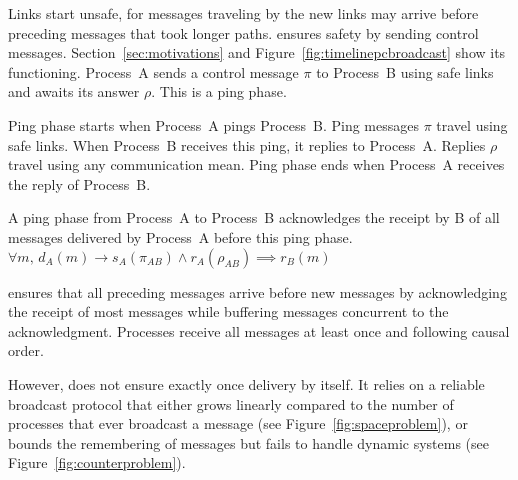 Links start unsafe, for messages traveling by the new links may arrive before
preceding messages that took longer paths. \PCBROADCAST ensures safety by
sending control messages. Section~\ref{sec:motivations} and
Figure~\ref{fig:timelinepcbroadcast} show its functioning. Process~A sends a
control message $\pi$ to Process~B using safe links and awaits its answer
$\rho$. This is a ping phase.

\begin{definition}
  Ping phase starts when Process~A pings Process~B. Ping messages $\pi$ travel
  using safe links. When Process~B receives this ping, it replies to
  Process~A. Replies $\rho$ travel using any communication mean. Ping phase ends
  when Process~A receives the reply of Process~B.
\end{definition}

\begin{lemma}
  A ping phase from Process~A to Process~B acknowledges the receipt by B of all
  messages delivered by Process~A before this ping phase.
  $\forall m,\, d_A(m) \rightarrow s_A(\pi_{AB}) \wedge r_A(\rho_{AB}) \implies
  r_B(m)$
\end{lemma}

\PCBROADCAST ensures that all preceding messages arrive before new messages by
acknowledging the receipt of most messages while buffering messages concurrent
to the acknowledgment. Processes receive all messages at least once and
following causal order.

However, \PCBROADCAST does not ensure exactly once delivery by itself. It relies
on a reliable broadcast protocol that either grows linearly compared to the
number of processes that ever broadcast a message (see
Figure~\ref{fig:spaceproblem}), or bounds the remembering of messages but fails
to handle dynamic systems (see Figure~\ref{fig:counterproblem}).





